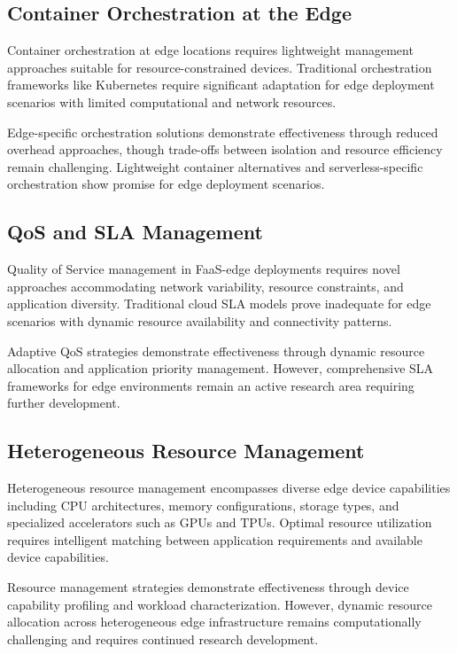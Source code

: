 \subsection{Container Orchestration at the Edge}

Container orchestration at edge locations requires lightweight management approaches suitable for resource-constrained devices. Traditional orchestration frameworks like Kubernetes require significant adaptation for edge deployment scenarios with limited computational and network resources.

Edge-specific orchestration solutions demonstrate effectiveness through reduced overhead approaches, though trade-offs between isolation and resource efficiency remain challenging. Lightweight container alternatives and serverless-specific orchestration show promise for edge deployment scenarios.

\subsection{QoS and SLA Management}

Quality of Service management in FaaS-edge deployments requires novel approaches accommodating network variability, resource constraints, and application diversity. Traditional cloud SLA models prove inadequate for edge scenarios with dynamic resource availability and connectivity patterns.

Adaptive QoS strategies demonstrate effectiveness through dynamic resource allocation and application priority management. However, comprehensive SLA frameworks for edge environments remain an active research area requiring further development.

\subsection{Heterogeneous Resource Management}

Heterogeneous resource management encompasses diverse edge device capabilities including CPU architectures, memory configurations, storage types, and specialized accelerators such as GPUs and TPUs. Optimal resource utilization requires intelligent matching between application requirements and available device capabilities.

Resource management strategies demonstrate effectiveness through device capability profiling and workload characterization. However, dynamic resource allocation across heterogeneous edge infrastructure remains computationally challenging and requires continued research development.

